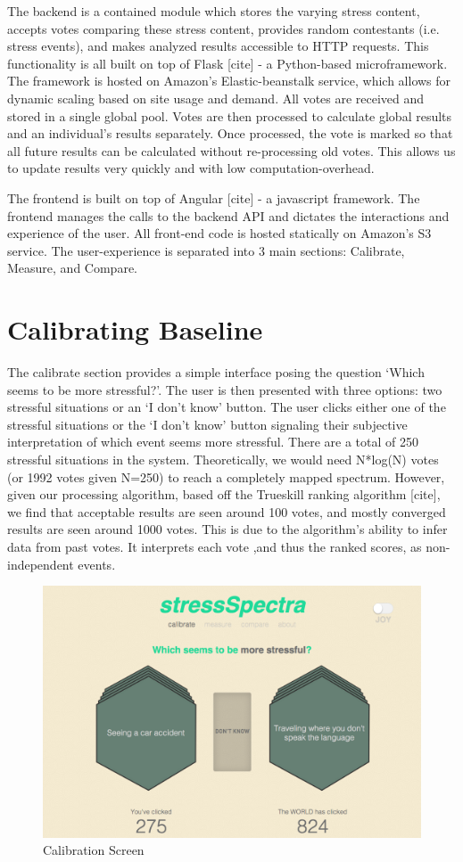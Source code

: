 \documentclass{sigchi}
\begin{document}
The backend is a contained module which stores the varying stress content, accepts votes comparing these stress content, provides random contestants (i.e. stress events), and makes analyzed results accessible to HTTP requests. This functionality is all built on top of Flask [cite] - a Python-based microframework. The framework is hosted on Amazon’s Elastic-beanstalk service, which allows for dynamic scaling based on site usage and demand. All votes are received and stored in a single global pool. Votes are then processed to calculate global results and an individual’s results separately. Once processed, the vote is marked so that all future results can be calculated without re-processing old votes. This allows us to update results very quickly and with low computation-overhead. 

The frontend is built on top of Angular [cite] - a javascript framework. The frontend manages the calls to the backend API and dictates the interactions and experience of the user. All front-end code is hosted statically on Amazon’s S3 service. The user-experience is separated into 3 main sections: Calibrate, Measure, and Compare. 




\section{Calibrating Baseline}
The calibrate section provides a simple interface posing the question ‘Which seems to be more stressful?’. The user is then presented with three options: two stressful situations or an ‘I don’t know’ button. The user clicks either one of the stressful situations or the ‘I don’t know’ button signaling their subjective interpretation of which event seems more stressful. There are a total of 250 stressful situations in the system. Theoretically, we would need N*log(N) votes (or 1992 votes given N=250) to reach a completely mapped spectrum. However, given our processing algorithm, based off the Trueskill ranking algorithm [cite], we find that acceptable results are seen around 100 votes, and mostly converged results are seen around 1000 votes. This is due to the algorithm’s ability to infer data from past votes. It interprets each vote ,and thus the ranked scores, as non-independent events.
\begin{figure}[!h]
\centering
\includegraphics[width=0.9\columnwidth]{calibrate}
\caption{Calibration Screen}
\label{fig:calibrate}
\end{figure}
\end{document}
